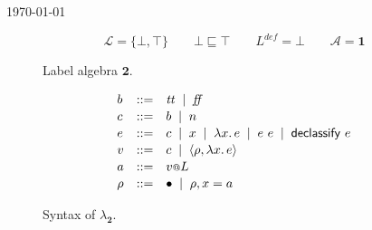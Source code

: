 \documentclass{article}
\makeatletter
\newcommand{\at}{\ensuremath{{\scriptstyle{@}}}}
\theoremstyle{definition}
\makeatother
\begin{document}
\begin{flushright}
  \today
\end{flushright}

\begin{figure}[ht]
  \centering
  \[
  \mathcal{L} = \{ \bot, \top \}
  \qquad
  \bot \sqsubseteq \top
  \qquad
  L^{\mathit{def}} = \bot
  \qquad
  \mathcal{A} = \mathbf{1}
  \]
  \caption{Label algebra $\mathbf{2}$.}
  \label{fig:two}
\end{figure}

\begin{figure}[ht]
  \centering
  \[
  \begin{array}[t]{lcl}
    b & ::= &
    \mathit{tt}\;\; |\;\;
    \mathit{ff}
    \\[0.3ex]
    c & :: = &
    b\;\; |\;\;
    n
    \\[0.3ex]
    e & ::= &
    c\;\; |\;\;
    x\;\; |\;\;
    \lambda{x}.\, e\;\; |\;\;
    e\ e\;\; |\;\;
    \mathsf{declassify}\ e
    \\[0.3ex]
    v & ::= &
    c\;\; |\;\;
    \langle{\rho, \lambda{x}.\, e\rangle}
    \\[0.3ex]
    a & ::= &
    v \at L
    \\[0.3ex]
    \rho & ::= &
    \bullet\;\; |\;\;
    \rho, x = a
  \end{array}
  \]
  \caption{Syntax of $\lambda_{\mathbf{2}}$.}
  \label{fig:syntax}
\end{figure}
\end{document}
